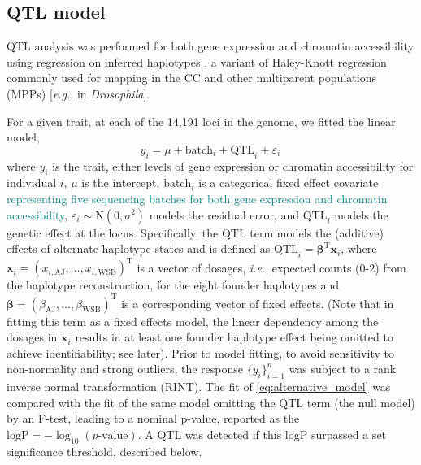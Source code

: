 \documentclass[9pt,twocolumn,twoside]{gsajnl}
\newcommand{\eg}{\emph{e.g.}\xspace}
\newcommand{\ie}{\emph{i.e.}\xspace}
\newcommand{\T}{^\mathrm{T}}
\newcommand{\bbeta}{\boldsymbol{\beta}}
\newcommand{\bx}{\mathbf{x}}
\newcommand{\GKinline}[1]{\textcolor{teal}{#1}}
\begin{document}
\subsection{QTL model}

QTL analysis was performed for both gene expression and chromatin accessibility using regression on inferred haplotypes \citep{Mott2000}, a variant of Haley-Knott regression \citep{Haley1992,Martinez1992} commonly used for mapping in the CC \citep{Valdar2006c,Aylor2011,Gralinski2015,Kelada2016,Donoghue2017,KeeleSPARCC} and other multiparent populations (MPPs) [\eg, \citet{King2012} in \textit{Drosophila}].

For a given trait, at each of the 14,191 loci in the genome, we fitted the linear model,
\begin{equation}
  y_i = \mu + \text{batch}_i + \text{QTL}_i + \varepsilon_i\, \label{eq:alternative_model}
\end{equation}
where $y_{i}$ is the trait, either levels of gene expression or chromatin accessibility for individual $i$, $\mu$ is the intercept, $\text{batch}_i$ is a categorical fixed effect covariate \GKinline{representing five sequencing batches for both gene expression and chromatin accessibility}, $\varepsilon_i\sim\text{N}(0,\sigma^2)$ models the residual error, and $\text{QTL}_{i}$ models the genetic effect at the locus. Specifically, the QTL term models the (additive) effects of alternate haplotype states and is defined as $\text{QTL}_{i}=\bbeta\T\bx_i$, where $\bx_i=(x_{i,\text{AJ}},\dots,x_{i,\text{WSB}})\T$ is a vector of dosages, \ie, expected counts (0-2) from the haplotype reconstruction, for the eight founder haplotypes and $\bbeta=(\beta_\text{AJ},\dots,\beta_\text{WSB})\T$ is a corresponding vector of fixed effects. (Note that in fitting this term as a fixed effects model, the linear dependency among the dosages in $\bx_i$ results in at least one founder haplotype effect being omitted to achieve identifiability; see later). Prior to model fitting, to avoid sensitivity to non-normality and strong outliers, the response $\{y_i\}^n_{i=1}$ was subject to a rank inverse normal transformation (RINT).
The fit of \autoref{eq:alternative_model} was compared with the fit of the same model omitting the QTL term (the null model) by an F-test, leading to a nominal p-value, reported as the $\text{logP}=-\log_{10}(\text{$p$-value})$. A QTL was detected if this logP surpassed a set significance threshold, described below. %

\end{document}
